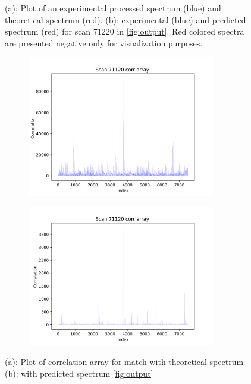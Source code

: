 \documentclass[11pt]{article}
\begin{document}
\begin{figure}
\begin{subfigure}[b]{1\textwidth}
   \caption{}
   \label{fig:predict}
\end{subfigure}
\caption{(a): Plot of an experimental processed spectrum (blue) and theoretical spectrum (red). (b): experimental (blue) and predicted spectrum (red) for scan 71220 in \cref{fig:output}. Red colored spectra are presented negative only for visualization purposes.}
\label{predandtheo}
\end{figure}

\begin{figure}
\centering
\begin{subfigure}[b]{1\textwidth}
    \includegraphics[width=0.9\textwidth]{figs/corrtheo.png}
   \caption{}
   \label{fig:corrtheo} 
\end{subfigure}
\begin{subfigure}[b]{1\textwidth}
   \includegraphics[width=0.9\textwidth]{figs/corrpredict.png}
   \caption{}
   \label{fig:corrpredict}
\end{subfigure}
\caption{(a): Plot of correlation array for match with theoretical spectrum (b): with predicted spectrum \cref{fig:output}}
\label{predandtheocorr}
\end{figure}
\end{document}
